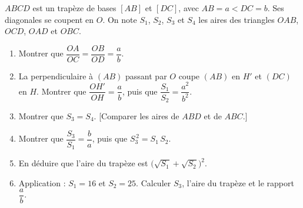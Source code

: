 
$ABCD$ est un trapèze de bases $[AB]$ et $[DC]$, avec $AB=a<DC=b$. Ses diagonales se coupent en $O$. On note $S_1$, $S_2$, $S_3$ et $S_4$ les aires des triangles $OAB$, $OCD$, $OAD$ et $OBC$.
\begin{center}
\end{center}
\begin{enumerate}
  \item Montrer que $\dfrac{OA}{OC}=\dfrac{OB}{OD}=\dfrac ab$.
  \item La perpendiculaire à $(AB)$ passant par $O$ coupe $(AB)$ en $H'$ et $(DC)$ en $H$. Montrer que $\dfrac{OH'}{OH}=\dfrac ab$, puis que $\dfrac{S_1}{S_2}=\dfrac{a^2}{b^2}$.
  \item Montrer que $S_3=S_4$. [Comparer les aires de $ABD$ et de $ABC$.]
  \item Montrer que $\dfrac{S_3}{S_1}=\dfrac ba$, puis que $S_3^{\,2}=S_1\,S_2$.
  \item En déduire que l'aire du trapèze est $\big(\sqrt{S_1}+\sqrt{S_2}\big)^2$.
  \item Application : $S_1=16$ et $S_2=25$. Calculer $S_3$, l'aire du trapèze et le rapport $\dfrac ab$.
\end{enumerate}


